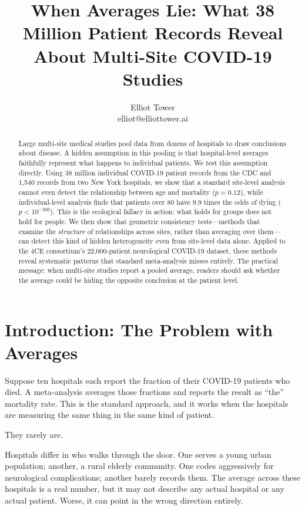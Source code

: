 \documentclass{article}
\title{When Averages Lie: What 38 Million Patient Records Reveal\\About Multi-Site COVID-19 Studies}
\author{\name Elliot Tower \\
      \email elliot@elliottower.ai}
\begin{document}
\maketitle

\begin{abstract}
Large multi-site medical studies pool data from dozens of hospitals to draw
conclusions about disease.  A hidden assumption in this pooling is that
hospital-level averages faithfully represent what happens to individual
patients.  We test this assumption directly.  Using 38 million individual
COVID-19 patient records from the CDC and 1,540 records from two New York
hospitals, we show that a standard site-level analysis cannot even detect the
relationship between age and mortality ($p = 0.12$), while individual-level
analysis finds that patients over 80 have 9.9 times the odds of dying ($p <
10^{-300}$).  This is the ecological fallacy in action: what holds for groups
does not hold for people.  We then show that geometric consistency
tests---methods that examine the \emph{structure} of relationships across
sites, rather than averaging over them---can detect this kind of hidden
heterogeneity even from site-level data alone.  Applied to the 4CE
consortium's 22,000-patient neurological COVID-19 dataset, these methods
reveal systematic patterns that standard meta-analysis misses entirely.  The
practical message: when multi-site studies report a pooled average, readers
should ask whether the average could be hiding the opposite conclusion at the
patient level.
\end{abstract}


\section{Introduction: The Problem with Averages}

Suppose ten hospitals each report the fraction of their COVID-19 patients who
died.  A meta-analysis averages those fractions and reports the result as
``the'' mortality rate.  This is the standard approach, and it works when the
hospitals are measuring the same thing in the same kind of patient.

They rarely are.

Hospitals differ in who walks through the door.  One serves a young urban
population; another, a rural elderly community.  One codes aggressively for
neurological complications; another barely records them.  The average across
these hospitals is a real number, but it may not describe any actual hospital
or any actual patient.  Worse, it can point in the wrong direction entirely.
\end{document}
